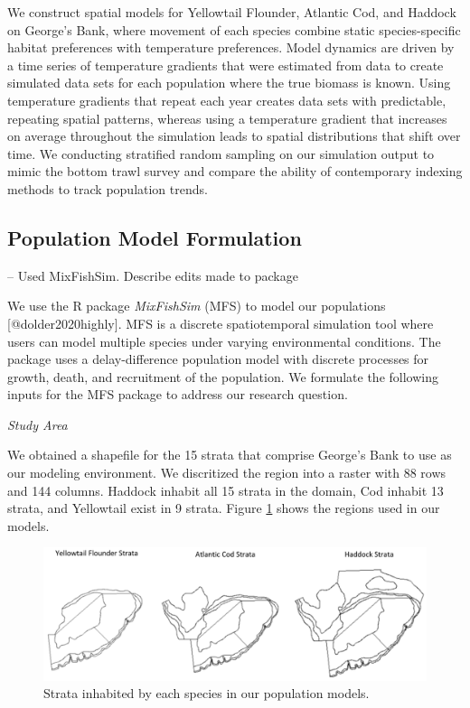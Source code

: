 \documentclass[
]{article}
\begin{document}
We construct spatial models for Yellowtail Flounder, Atlantic Cod, and Haddock on George's Bank, where movement of each species combine static species-specific habitat preferences with temperature preferences. Model dynamics are driven by a time series of temperature gradients that were estimated from data to create simulated data sets for each population where the true biomass is known. Using temperature gradients that repeat each year creates data sets with predictable, repeating spatial patterns, whereas using a temperature gradient that increases on average throughout the simulation leads to spatial distributions that shift over time. We conducting stratified random sampling on our simulation output to mimic the bottom trawl survey and compare the ability of contemporary indexing methods to track population trends.

\subsection{Population Model Formulation}

-- Used MixFishSim. Describe edits made to package

We use the R package \emph{MixFishSim} (MFS) to model our populations {[}@dolder2020highly{]}. MFS is a discrete spatiotemporal simulation tool where users can model multiple species under varying environmental conditions. The package uses a delay-difference population model with discrete processes for growth, death, and recruitment of the population. We formulate the following inputs for the MFS package to address our research question.

\emph{Study Area}

We obtained a shapefile for the 15 strata that comprise George's Bank to use as our modeling environment. We discritized the region into a raster with 88 rows and 144 columns. Haddock inhabit all 15 strata in the domain, Cod inhabit 13 strata, and Yellowtail exist in 9 strata. Figure \ref{fig:strata-plot} shows the regions used in our models.

\begin{figure}

{\centering \includegraphics[width=0.95\linewidth]{Images/Strata} 

}

\caption{Strata inhabited by each species in our population models.}\label{fig:strata-plot}
\end{figure}
\end{document}
